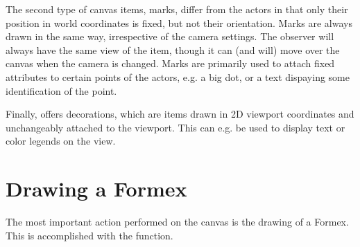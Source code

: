 The second type of canvas items, marks, differ from the actors in that only their position in world coordinates is fixed, but not their orientation. Marks are always drawn in the same way, irrespective of the camera settings. The observer will always have the same view of the item, though it can (and will) move over the canvas when the camera is changed. Marks are primarily used to attach fixed attributes to certain points of the actors, e.g. a big dot, or a text dispaying some identification of the point.

Finally, \pyformex offers decorations, which are items drawn in 2D viewport coordinates and unchangeably attached to the viewport. This can e.g. be used to display text or color legends on the view.

   
\section{Drawing a Formex}
The most important action performed on the canvas is the drawing of a Formex.
This is accomplished with the  function.
 
